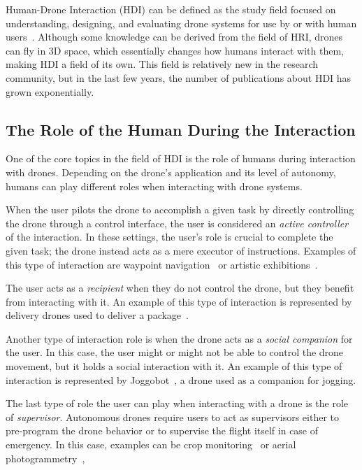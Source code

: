 Human-Drone Interaction (HDI) can be defined as the study field focused on understanding, designing, and evaluating drone systems 
for use by or with human users~\cite{tezza2019hdi}. Although some knowledge can be derived from the field of HRI, 
drones can fly in 3D space, which essentially changes how humans interact with them, making HDI a field of its own.
This field is relatively new in the research community, but in the last few years, the number of publications about HDI has grown exponentially.

\subsection{The Role of the Human During the Interaction}\label{subsec:hdi_interacction_role}
One of the core topics in the field of HDI is the role of humans during interaction with drones.
Depending on the drone's application and its level of autonomy, humans can play different roles when interacting with drone systems.

When the user pilots the drone to accomplish a given task by directly controlling the drone through a control interface, 
the user is considered an \textit{active controller} of the interaction. In these settings, the user's role is crucial to complete the given task; the drone instead acts as a mere executor of instructions. 
Examples of this type of interaction are waypoint navigation~\cite{hoppe2019droneOS} or artistic exhibitions~\cite{eriksson2020ethicsInMovement}.

The user acts as a \textit{recipient} when they do not control the drone, but they benefit from interacting with it. 
An example of this type of interaction is represented by delivery drones used to deliver a package~\cite{singireddy2018primeAir,hoppe2019droneOS, wingDrones}.

Another type of interaction role is when the drone acts as a \textit{social companion} for the user. 
In this case, the user might or might not be able to control the drone movement, but it holds a social interaction with it.
An example of this type of interaction is represented by Joggobot~\cite{graether2012joggobot}, a drone used as a companion for jogging.

The last type of role the user can play when interacting with a drone is the role of \textit{supervisor}.
Autonomous drones require users to act as supervisors either to pre-program the drone behavior or to 
supervise the flight itself in case of emergency. In this case, examples can be crop monitoring~\cite{dantu2011karma} or aerial photogrammetry~\cite{nex2014uav3Dmapping}, 

